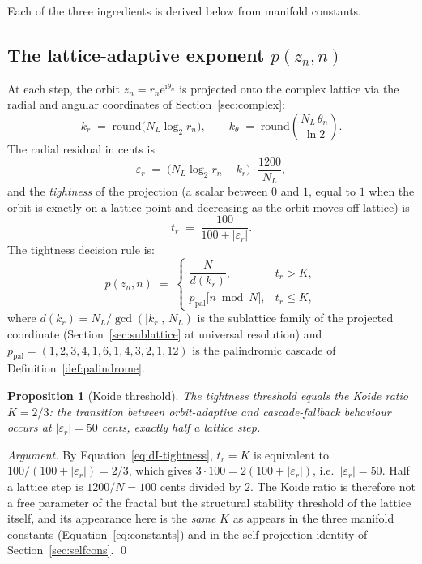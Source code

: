 \documentclass[11pt,a4paper]{article}
\newtheorem{proposition}[theorem]{Proposition}
\theoremstyle{definition}
\theoremstyle{remark}
\begin{document}
Each of the three ingredients is derived below from manifold constants.

\subsection{The lattice-adaptive exponent $p(z_{n},n)$}\label{subsec:dI-exponent}

At each step, the orbit $z_{n}=r_{n}\mathrm{e}^{\mathrm{i}\theta_{n}}$ is projected onto the complex lattice via the radial and angular coordinates of Section~\ref{sec:complex}:
\begin{equation}
k_{r} \;=\; \mathrm{round}\bigl(N_{L}\log_{2}r_{n}\bigr), \qquad
k_{\theta} \;=\; \mathrm{round}\!\left(\frac{N_{L}\,\theta_{n}}{\ln 2}\right).
\end{equation}
The radial residual in cents is
\begin{equation}
\varepsilon_{r} \;=\; \bigl(N_{L}\log_{2}r_{n} - k_{r}\bigr)\cdot\frac{1200}{N_{L}},
\label{eq:dI-eps}
\end{equation}
and the \emph{tightness} of the projection (a scalar between $0$ and $1$, equal to $1$ when the orbit is exactly on a lattice point and decreasing as the orbit moves off-lattice) is
\begin{equation}
t_{r} \;=\; \frac{100}{100+|\varepsilon_{r}|}.
\label{eq:dI-tightness}
\end{equation}
The tightness decision rule is:
\[
p(z_{n},n) \;=\; \begin{cases}
\dfrac{N}{d(k_{r})}, & t_{r} > K, \\[0.8em]
p_{\mathrm{pal}}\!\bigl[n\bmod N\bigr], & t_{r} \leq K,
\end{cases}
\]
where $d(k_{r}) = N_{L}/\gcd(|k_{r}|,\,N_{L})$ is the sublattice family of the projected coordinate (Section~\ref{sec:sublattice} at universal resolution) and $p_{\mathrm{pal}}=(1,2,3,4,1,6,1,4,3,2,1,12)$ is the palindromic cascade of Definition~\ref{def:palindrome}.

\begin{proposition}[Koide threshold]\label{prop:koide-threshold}
The tightness threshold equals the Koide ratio $K=2/3$: the transition between orbit-adaptive and cascade-fallback behaviour occurs at $|\varepsilon_{r}| = 50$ cents, exactly half a lattice step.
\end{proposition}

\begin{proof}[Argument]
By Equation~\eqref{eq:dI-tightness}, $t_{r} = K$ is equivalent to $100/(100+|\varepsilon_{r}|) = 2/3$, which gives $3\cdot 100 = 2(100+|\varepsilon_{r}|)$, i.e.\ $|\varepsilon_{r}|=50$. Half a lattice step is $1200/N = 100$ cents divided by $2$. The Koide ratio is therefore not a free parameter of the fractal but the structural stability threshold of the lattice itself, and its appearance here is the \emph{same} $K$ as appears in the three manifold constants (Equation~\eqref{eq:constants}) and in the self-projection identity of Section~\ref{sec:selfcons}. \qed
\end{proof}
\end{document}
